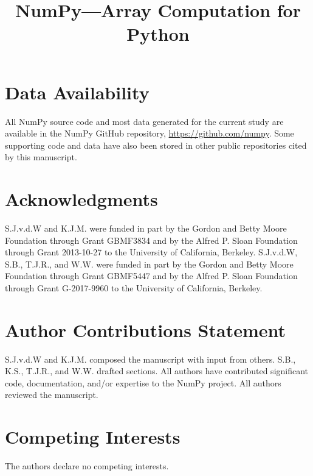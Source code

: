 \documentclass[fleqn,10pt]{wlscirep}
\title{NumPy---Array Computation for Python}
\begin{document}
\flushbottom
\maketitle
\thispagestyle{empty}





\section*{Data Availability}

All NumPy source code and most data generated for the current study are
available in the NumPy GitHub repository, \url{https://github.com/numpy}. Some
supporting code and data have also been stored in other public repositories
cited by this manuscript.



\section*{Acknowledgments}

S.J.v.d.W and K.J.M. were funded in part by the Gordon and Betty Moore
Foundation through Grant GBMF3834 and by the Alfred P. Sloan Foundation through
Grant 2013-10-27 to the University of California, Berkeley.
S.J.v.d.W, S.B., T.J.R., and W.W. were funded in part by the Gordon
and Betty Moore Foundation through Grant GBMF5447 and by the Alfred
P. Sloan Foundation through Grant G-2017-9960 to the University of
California, Berkeley.


\section*{Author Contributions Statement}

S.J.v.d.W and K.J.M. composed the manuscript with input from others.
S.B., K.S., T.J.R., and W.W. drafted sections.
All authors have contributed significant code, documentation, and/or expertise
to the NumPy project.
All authors reviewed the manuscript.

\section*{Competing Interests}

The authors declare no competing interests.
\end{document}
